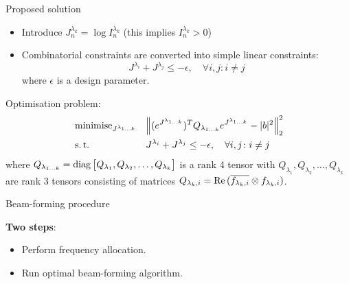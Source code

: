 \documentclass[../main.tex]{subfiles}
\begin{document}
\begin{frame}[t]{Proposed solution}

\begin{itemize}
\item Introduce $J^{\lambda_k}_n = \log{I^{\lambda_k}_n}$ (this implies $I^{\lambda_k}_n > 0$)
\item Combinatorial constraints are converted into simple linear constraints:
    \begin{equation*}
  J^{\lambda_i} + J^{\lambda_j} \le -\epsilon, \quad \forall i, j \colon i \ne j
    \end{equation*}
    where $\epsilon$ is a design parameter. 
\end{itemize}

Optimisation problem:
\begin{equation*}
\begin{aligned}
& \operatorname{minimise}_{J^{\lambda_{1\ldots k}}} 
& & \Big\| (e^{J^{\lambda_{1 \ldots k}}})^T Q_{\lambda_{1 \ldots k}}  e^{J^{\lambda_{1 \ldots k}}} - |b|^2 \Big\|_2^2 \\
& \operatorname{s.t.}
& & J^{\lambda_i} + J^{\lambda_j} \le -\epsilon, \quad \forall i, j \colon i \ne j \\
\end{aligned}
\end{equation*}
where $Q_{\lambda_{1 \ldots k}} = \operatorname{diag}{\big[Q_{\lambda_{1}}, Q_{\lambda_{2}}, \ldots, Q_{\lambda_{k}}\big]}$ is a rank 4 tensor with $Q_{\lambda_{1}}, Q_{\lambda_{2}}, \ldots, Q_{\lambda_{k}}$ are rank 3 tensors consisting of matrices $Q_{\lambda_{k}, i} = \operatorname{Re}{(\overline{f_{\lambda_{k}, i}} \otimes f_{\lambda_{k}, i} )}$. 

\end{frame}



\begin{frame}[t]{Beam-forming procedure}
 
\textbf{Two steps}:
\begin{itemize}
    \item Perform frequency allocation.
    \item Run optimal beam-forming algorithm.
\end{itemize}



\end{frame}


%
%
\end{document}
